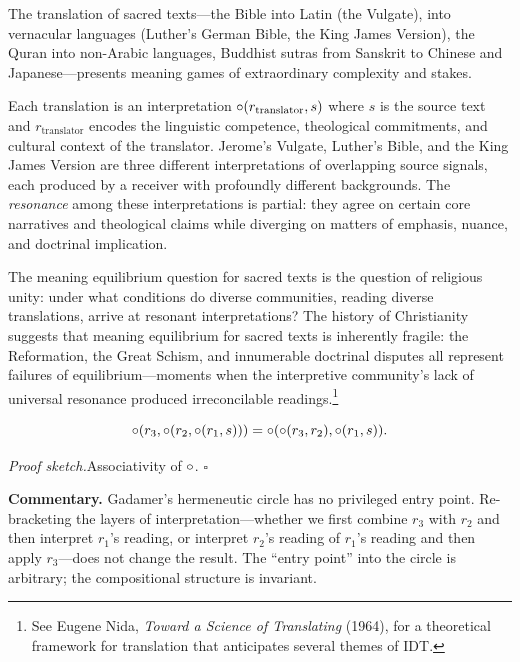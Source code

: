 \begin{example}
\label{ex:sacred_translation}
The translation of sacred texts---the Bible into Latin (the Vulgate), into
vernacular languages (Luther's German Bible, the King James Version), the
Quran into non-Arabic languages, Buddhist sutras from Sanskrit to Chinese
and Japanese---presents meaning games of extraordinary complexity and
stakes.

Each translation is an interpretation $\circ(r_{\text{translator}}, s)$
where $s$ is the source text and $r_{\text{translator}}$ encodes the
linguistic competence, theological commitments, and cultural context of
the translator.  Jerome's Vulgate, Luther's Bible, and the King James
Version are three different interpretations of overlapping source signals,
each produced by a receiver with profoundly different backgrounds.  The
\emph{resonance} among these interpretations is partial: they agree on
certain core narratives and theological claims while diverging on matters
of emphasis, nuance, and doctrinal implication.

The meaning equilibrium question for sacred texts is the question of
religious unity: under what conditions do diverse communities, reading
diverse translations, arrive at resonant interpretations?  The history
of Christianity suggests that meaning equilibrium for sacred texts is
inherently fragile: the Reformation, the Great Schism, and innumerable
doctrinal disputes all represent failures of equilibrium---moments when
the interpretive community's lack of universal resonance produced
irreconcilable readings.\footnote{See Eugene Nida, \textit{Toward a
Science of Translating} (1964), for a theoretical framework for
translation that anticipates several themes of IDT.}
\end{example}

\begin{theorem}
\label{thm:iterated_interpretation_assoc}
\[
  \circ(r_3, \circ(r_2, \circ(r_1, s))) =
  \circ(\circ(r_3, r_2), \circ(r_1, s)).
\]
\end{theorem}

\noindent\textit{Proof sketch.}\quad Associativity of $\circ$. \hfill$\square$

\medskip

\noindent\textbf{Commentary.}
Gadamer's hermeneutic circle has no privileged entry point.  Re-bracketing
the layers of interpretation---whether we first combine $r_3$ with $r_2$
and then interpret $r_1$'s reading, or interpret $r_2$'s reading of $r_1$'s
reading and then apply $r_3$---does not change the result.  The
``entry point'' into the circle is arbitrary; the compositional structure is
invariant.

